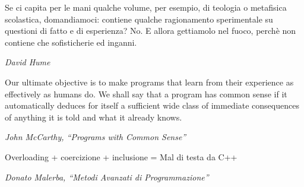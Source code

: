 \begin{titlepage}
    \fancyhf{}
    \newpage
        \vspace*{\fill}

        \begin{center}
        \begin{minipage}{0.9\textwidth}
        Se ci capita per le mani qualche volume, per esempio, di teologia  o
        metafisica scolastica, domandiamoci: contiene qualche ragionamento sperimentale
        su questioni di fatto e di esperienza? No. E allora gettiamolo nel fuoco,
        perch\`e non contiene che sofisticherie ed inganni.
        \end{minipage}
        \end{center}

        \begin{flushright}
        \textit{David Hume}
        \end{flushright}

        \vspace*{\fill}

        \begin{center}
        \begin{minipage}{0.9\textwidth}
        Our ultimate objective is to make programs that learn from their experience as
        effectively as humans do. We shall say that a program has common sense if it
        automatically deduces for itself a sufficient wide class of immediate consequences
        of anything it is told and what it already knows.
        \end{minipage}
        \end{center}

        \begin{flushright}
        \textit{John McCarthy, ``Programs with Common Sense''}
        \end{flushright}

        \vspace*{\fill}

        \begin{center}
        \begin{minipage}{0.9\textwidth}
        Overloading + coercizione + inclusione = Mal di testa da C++
        \end{minipage}
        \end{center}

        \begin{flushright}
        \textit{Donato Malerba, ``Metodi Avanzati di Programmazione''}
        \end{flushright}

        \vspace*{\fill}	

    \newpage
\end{titlepage}

